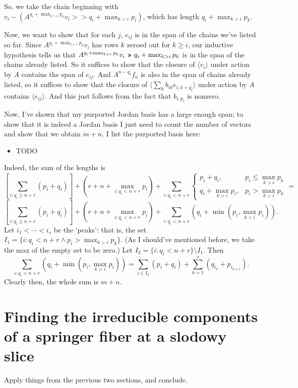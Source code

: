 \documentclass[12pt,psamsfonts]{article}
\newcommand{\leftshift}{$\,\texttt{<<}\,$}
\newcommand{\rightshift}{\mathbin{\rotatebox[origin=c]{180}{\leftshift}}}
\begin{document}
So, we take the chain beginning with \(v_i - (A^{q_i + \max_{k > i} p_k} v_i >> q_i + \max_{k > i} p_i)\), which has length \(q_i + \max_{k > i} p_k\).
\par Now, we want to show that for each \(j\), \(e_{ij}\) is in the span of the chains we've listed so far.
Since \(A^{q_i + \max_{k > i} p_k} v_i\) has rows \(k\) zeroed out for \(k \geq i\), our inductive hypothesis tells us that \(A^{q_i + \max_{k > i} p_k} v_i \rightshift q_i + \max_{k > i} p_k\) is in the span of the chains already listed.
So it suffices to show that the closure of \(\langle v_i \rangle\) under action by \(A\) contains the span of \(e_{ij}\).
And \(A^{n - q_i} f_n\) is also in the span of chains already listed, so it suffices to show that the closure of \(\langle \sum_k b_{ik} e_{i,k + q_i}\rangle \) under action by \(A\) contains \(\langle e_{ij}\rangle\).
And this just follows from the fact that \(b_{i,p_i}\) is nonzero.
\par Now, I've shown that my purported Jordan basis has a large enough span; to show that it is indeed a Jordan basis I just need to count the number of vectors and show that we obtain \(m + n\).
I list the purported basis here:
\begin{itemize}
    \item TODO
\end{itemize}
Indeed, the sum of the lengths is
\[\left[\sum_{i : q_i \geq n + r} (p_i + q_i)\right] + (r + n + \max_{i : q_i < n + r} p_i) + \sum_{i : q_i < n + r} \begin{cases}
    p_i + q_i, & p_i \leq \max_{k > i} p_k \\
    q_i + \max_{k > i} p_i, & p_i > \max_{k > i} p_k
\end{cases} = \]
\[\left[\sum_{i : q_i \geq n + r} (p_i + q_i)\right] + (r + n + \max_{i : q_i < n + r} p_i) + \sum_{i : q_i < n + r} (q_i + \min(p_i, \max_{k > i} p_i)).\]
Let \(i_1 < \cdots < i_s\) be the `peaks': that is, the set \(I_1 = \{i : q_i < n + r \land p_i > \max_{k > i} p_k\}\).
(As I should've mentioned before, we take the max of the empty set to be zero.)
Let \(I_2 = \{i : q_i < n + r\} \setminus I_1\).
Then 
\[\sum_{i : q_i < n + r} (q_i + \min(p_i, \max_{k > i} p_i)) = \sum_{i \in I_2} (p_i + q_i) + \sum_{k = 1}^s (q_{i_k} + p_{i_{k + 1}}).\]
Clearly then, the whole sum is \(m + n\).



\section{Finding the irreducible components of a springer fiber at a slodowy slice}
Apply things from the previous two sections, and conclude.
\end{document}
